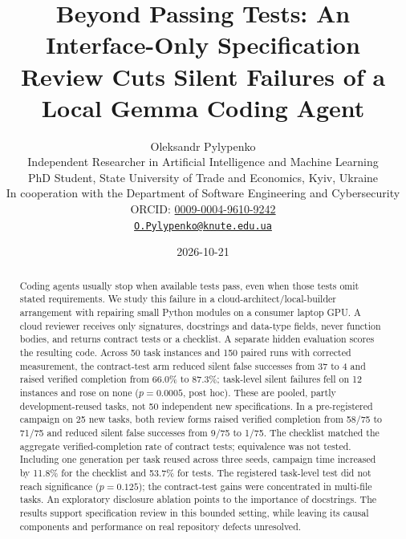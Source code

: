 \documentclass[11pt]{article}
\begin{document}

\title{Beyond Passing Tests: An Interface-Only Specification Review Cuts Silent Failures of a Local Gemma Coding Agent}
\author{Oleksandr Pylypenko\\[2pt]\small Independent Researcher in Artificial Intelligence and Machine Learning\\ \small PhD Student, State University of Trade and Economics, Kyiv, Ukraine\\ \small In cooperation with the Department of Software Engineering and Cybersecurity\\[2pt]
\small ORCID: \href{https://orcid.org/0009-0004-9610-9242}{0009-0004-9610-9242}\\ \small\href{mailto:O.Pylypenko@knute.edu.ua}{\texttt{O.Pylypenko@knute.edu.ua}}}
\date{2026-10-21}
\maketitle

\begin{abstract}
\noindent
Coding agents usually stop when available tests pass, even when those tests omit stated requirements. We study this failure in a cloud-architect/local-builder arrangement with  repairing small Python modules on a consumer laptop GPU. A cloud reviewer receives only signatures, docstrings and data-type fields, never function bodies, and returns contract tests or a checklist. A separate hidden evaluation scores the resulting code. Across 50 task instances and 150 paired runs with corrected measurement, the contract-test arm reduced silent false successes from 37 to 4 and raised verified completion from 66.0\% to 87.3\%; task-level silent failures fell on 12 instances and rose on none ($p=0.0005$, post hoc). These are pooled, partly development-reused tasks, not 50 independent new specifications. In a pre-registered campaign on 25 new tasks, both review forms raised verified completion from 58/75 to 71/75 and reduced silent false successes from 9/75 to 1/75. The checklist matched the aggregate verified-completion rate of contract tests; equivalence was not tested. Including one generation per task reused across three seeds, campaign time increased by 11.8\% for the checklist and 53.7\% for tests. The registered task-level test did not reach significance ($p=0.125$); the contract-test gains were concentrated in multi-file tasks. An exploratory disclosure ablation points to the importance of docstrings. The results support specification review in this bounded setting, while leaving its causal components and performance on real repository defects unresolved.
\end{abstract}
\end{document}
